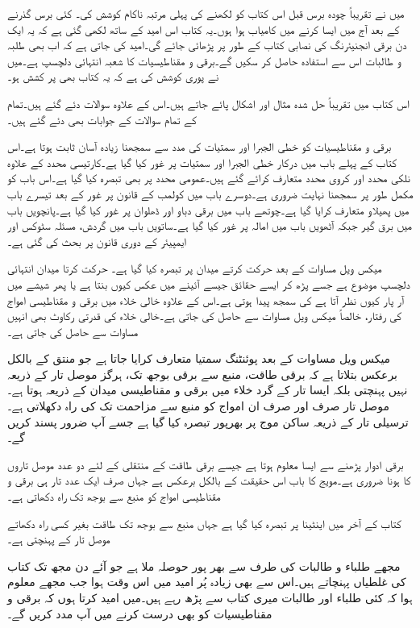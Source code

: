 میں نے تقریباً چودہ برس قبل اس کتاب کو لکھنے کی پہلی مرتبہ ناکام کوشش کی۔ کئی برس گذرنے کے بعد آج میں ایسا کرنے میں کامیاب ہوا ہوں۔یہ کتاب اس امید کے ساتھ لکھی گئی ہے کہ یہ ایک دن برقی انجنیئرنگ کی نصابی کتاب کے طور پر پڑھائی جائے گی۔امید کی جاتی ہے کہ اب بھی طلبہ و طالبات اس سے استفادہ حاصل کر سکیں گے۔برقی و مقناطیسیات کا شعبہ انتہائی دلچسپ ہے۔میں نے پوری کوشش کی ہے کہ یہ کتاب بھی پر کشش ہو۔


اس کتاب میں تقریباً  حل شدہ مثال اور  اشکال پائے جاتے ہیں۔اس کے علاوہ  سوالات دئے گئے ہیں۔تمام کے تمام سوالات کے جوابات بھی دئے گئے ہیں۔

برقی و مقناطیسیات کو خطی الجبرا اور سمتیات کی مدد سے سمجھنا زیادہ آسان ثابت ہوتا ہے۔اس کتاب کے پہلے باب میں درکار خطی الجبرا اور سمتیات پر غور کیا گیا ہے۔کارتیسی محدد کے علاوہ نلکی محدد اور کروی محدد متعارف کرائے گئے ہیں۔عمومی محدد پر بھی تبصرہ کیا گیا ہے۔اس باب کو مکمل طور پر سمجھنا نہایت ضروری ہے۔دوسرے باب میں کولمب کے قانون پر غور کے بعد تیسرے باب میں پھیلاو متعارف کرایا گیا ہے۔چوتھے باب میں برقی دباو اور ڈھلوان پر غور کیا گیا ہے۔پانچویں باب میں برق گیر جبکہ آٹھویں باب میں امالہ پر غور کیا گیا ہے۔ساتویں باب میں گردش، مسئلہ سٹوکس اور ایمپیئر کے دوری قانون پر بحث کی گئی ہے۔ 

میکس ویل مساوات کے بعد حرکت کرتے میدان پر تبصرہ کیا گیا ہے۔ حرکت کرتا میدان انتہائی دلچسپ موضوع ہے جسے پڑھ کر ایسے حقائق جیسے  آئینے میں عکس کیوں بنتا ہے یا پھر شیشے میں آر پار کیوں نظر آتا ہے کی سمجھ پیدا ہوتی ہے۔اس کے علاوہ خالی خلاء میں برقی و مقناطیسی امواج کی رفتار، خالصاً میکس ویل مساوات سے حاصل کی جاتی ہے۔خالی خلاء کی قدرتی رکاوٹ بھی انہیں مساوات سے حاصل کی جاتی ہے۔

میکس ویل مساوات کے بعد پوئنٹنگ سمتیا متعارف کرایا جاتا ہے جو منتق کے بالکل برعکس بتلاتا ہے کہ برقی طاقت، منبع سے برقی بوجھ تک، ہرگز موصل تار کے ذریعہ نہیں پہنچتی بلکہ ایسا تار کے گرد خلاء میں برقی و مقناطیسی میدان کے ذریعہ ہوتا ہے۔موصل تار صرف اور صرف ان امواج کو منبع سے مزاحمت تک کی راہ دکھلاتی ہے۔ترسیلی تار کے ذریعہ ساکن موج پر بھرپور تبصرہ کیا گیا ہے جسے آپ ضرور پسند کریں گے۔

برقی ادوار پڑھنے سے ایسا معلوم ہوتا ہے جیسے برقی طاقت کے منتقلی کے لئے دو عدد موصل تاروں کا ہونا ضروری ہے۔مویج کا باب اس حقیقت کے بالکل برعکس ہے جہاں صرف ایک عدد تار  ہی برقی و مقناطیسی امواج کو منبع سے بوجھ تک راہ دکھاتی ہے۔

کتاب کے آخر میں اینٹینا پر تبصرہ کیا گیا ہے جہاں منبع سے بوجھ تک طاقت بغیر کسی راہ دکھاتے موصل تار کے پہنچتی ہے۔

مجھے طلباء و طالبات کی طرف سے بھر پور حوصلہ ملا ہے جو آئے دن مجھ تک کتاب کی غلطیاں پہنچاتے ہیں۔اس سے بھی زیادہ پُر امید میں اس وقت ہوا جب مجھے معلوم ہوا کہ کئی طلباء اور طالبات میری کتاب سے پڑھ رہے ہیں۔میں امید کرتا ہوں کہ برقی و مقناطیسیات کو بھی درست کرنے میں آپ مدد کریں گے۔

